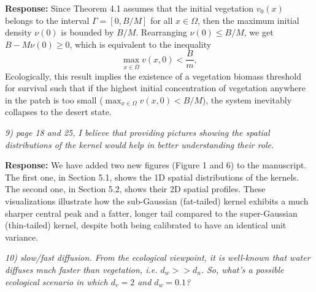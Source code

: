 \documentclass[11pt,a4paper]{article}
\newcommand{\comment}[1]{\vspace{0.5em}\noindent\textit{\textcolor{revcolor}{#1}}}
\newcommand{\response}[1]{\vspace{0.5em}\noindent\textbf{\textcolor{authorcolor}{Response:}} \textcolor{authorcolor}{#1}}
\begin{document}
\response{
Since Theorem 4.1 assumes that the initial vegetation $v_0(x)$ belongs to the interval $\Gamma = [0, B/M]$ for all $x\in\Omega$, then the maximum initial density $\nu(0)$ is bounded by $B/M$. Rearranging $\nu(0) \leq B/M$, we get $B - M\nu(0) \geq 0$, which is equivalent to the inequality
\begin{equation*}
    \max_{x \in \overline{\Omega}} v(x, 0) < \frac{B}{m},
\end{equation*}
Ecologically, this result implies the existence of a vegetation biomass threshold for survival such that if the highest initial concentration of vegetation anywhere in the patch is too small ($\max_{x \in \Omega} v(x,0) < B/M$), the system inevitably collapses to the desert state.
}

\comment{9) page 18 and 25, I believe that providing pictures showing the spatial distributions of the kernel would help in better understanding their role.}

\response{We have added two new figures (Figure 1 and 6) to the manuscript. The first one, in Section 5.1, shows the 1D spatial distributions of the kernels. The second one, in Section 5.2, shows their 2D spatial profiles. These visualizations illustrate how the sub-Gaussian (fat-tailed) kernel exhibits a much sharper central peak and a fatter, longer tail compared to the super-Gaussian (thin-tailed) kernel, despite both being calibrated to have an identical unit variance.}

\comment{10) slow/fast diffusion. From the ecological viewpoint, it is well-known that water diffuses much faster than vegetation, i.e. $d_w >> d_u$. So, what's a possible ecological scenario in which $d_v=2$ and $d_w=0.1$?}
\end{document}
